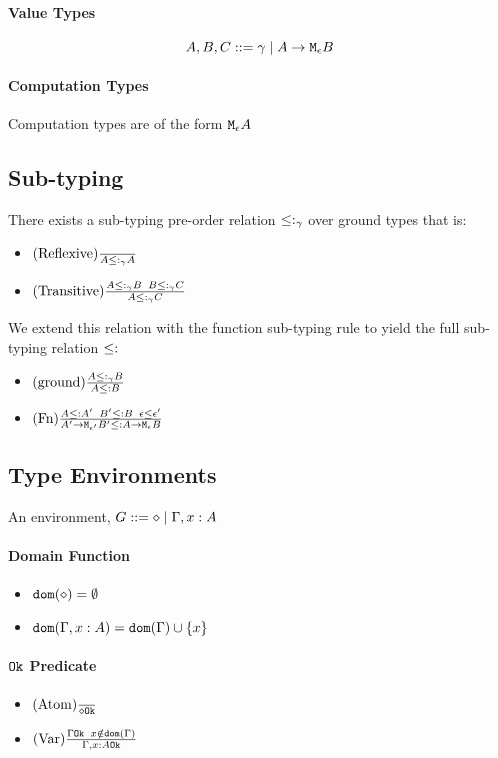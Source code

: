 {        \paragraph{Value Types}
        $$ A, B, C ::= \gamma \mid A \rightarrow \texttt{M}_{\epsilon}{B} $$
        \paragraph{Computation Types}
        Computation types are of the form $\texttt{M}_{\epsilon}{A}$

    \subsection{Sub-typing}
        There exists a sub-typing pre-order relation $\leq:_{\gamma}$ over ground types that is:
        \begin{itemize}
            \item $(\text{Reflexive}) \frac{}{A \leq:_{\gamma} A}$
            \item $(\text{Transitive}) \frac{A \leq:_{\gamma} B \; \; B \leq:_{\gamma} C}{A \leq:_{\gamma} C}$
        \end{itemize}

        We extend this relation with the function sub-typing rule to yield the full sub-typing relation $\leq:$

        \begin{itemize}
            \item $(\text{ground}) \frac{A \leq:_{\gamma} B}{A \leq: B}$
            \item $(\text{Fn}) \frac{A \leq: A' \;\; B' \leq: B \; \; \epsilon \leq \epsilon'}{A' \rightarrow \texttt{M}_{\epsilon'}{B'} \leq: A \rightarrow \texttt{M}_{\epsilon}{B}}$
        \end{itemize}
    \subsection{Type Environments}
    An environment, $G ::= \diamond \mid \Gamma, x: A$ 
    \paragraph{Domain Function}
    \begin{itemize}
        \item $\texttt{dom}(\diamond) = \emptyset$
        \item $\texttt{dom}(\Gamma, x: A) =  \texttt{dom}(\Gamma)  \cup \left\{x \right\}$
    \end{itemize}
    \paragraph{$\texttt{Ok}$ Predicate}
    \begin{itemize}
        \item $(\text{Atom}) \frac{}{\diamond \texttt{Ok}}$
        \item $(\text{Var}) \frac{\Gamma \texttt{Ok} \;\; x\notin \texttt{dom}(\Gamma)}{\Gamma, x: A \texttt{Ok}}$
    \end{itemize}



}
